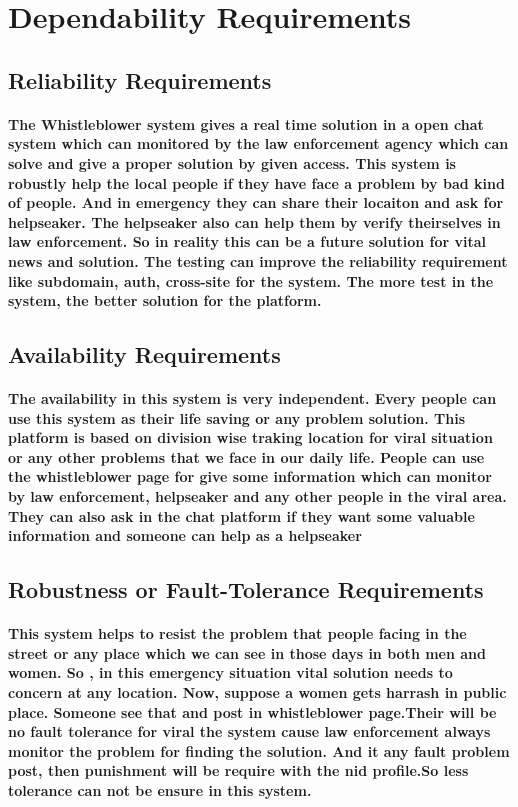 \documentclass{article}
\begin{document}
\section{Dependability Requirements}
\subsection{Reliability Requirements}
\paragraph{The Whistleblower system gives a real time solution in a open chat system which can monitored by the law enforcement agency 
which can solve and give a proper solution by given access. This system is robustly help the local people if they have face a problem by bad kind of people. And in emergency they can share their locaiton and ask for helpseaker. The helpseaker also can help them by verify theirselves in law enforcement. So in reality this can be a future solution for vital news and solution. The testing can improve the reliability requirement like subdomain, auth, cross-site for the system. The more test in the system, the better solution for the platform.}

\subsection{Availability Requirements }
\paragraph{The availability in this system is very independent. Every people can use this system as their life saving or any problem solution. This platform is based on division wise traking location for viral situation or any other problems that we face in our daily life. People can use the whistleblower page for give some information which can monitor by law enforcement, helpseaker and any other people in the viral area.
 They can also ask in the chat platform if they want some valuable information and someone can help as a helpseaker}

\newpage
\subsection{Robustness or Fault-Tolerance Requirements }
\paragraph{This system helps to  resist the problem that people facing in the street or any place which we can see in those days in both men and women.
So , in this emergency situation vital solution needs to concern at any location. Now, suppose a women gets harrash in public place. Someone see that and post in whistleblower page.Their will be 
no fault tolerance for viral the system  cause law enforcement always monitor the problem for finding the solution. And it any fault problem post, then punishment will be require with the nid profile.So less tolerance can not be 
ensure in this system.
}
\end{document}
